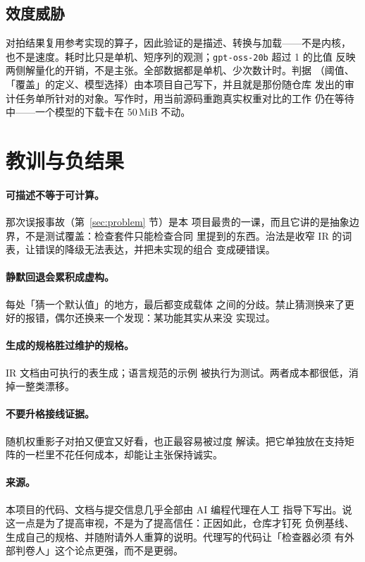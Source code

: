 \documentclass[11pt,a4paper]{ctexart}
\newcommand{\code}[1]{\texttt{#1}}
\newcommand{\q}[1]{「#1」}
\begin{document}
\subsection{效度威胁}

对拍结果复用参考实现的算子，因此验证的是描述、转换与加载——不是内核，
也不是速度。耗时比只是单机、短序列的观测；\code{gpt-oss-20b} 超过 1 的比值
反映两侧解量化的开销，不是主张。全部数据都是单机、少次数计时。判据
（阈值、\q{覆盖}的定义、模型选择）由本项目自己写下，并且就是那份随仓库
发出的审计任务单所针对的对象。写作时，用当前源码重跑真实权重对比的工作
仍在等待中——一个模型的下载卡在 50\,MiB 不动。

\section{教训与负结果}
\label{sec:lessons}

\paragraph{可描述不等于可计算。}那次误报事故（第~\ref{sec:problem} 节）是本
项目最贵的一课，而且它讲的是抽象边界，不是测试覆盖：检查套件只能检查合同
里提到的东西。治法是收窄 IR 的词表，让错误的降级无法表达，并把未实现的组合
变成硬错误。

\paragraph{静默回退会累积成虚构。}每处「猜一个默认值」的地方，最后都变成载体
之间的分歧。禁止猜测换来了更好的报错，偶尔还换来一个发现：某功能其实从来没
实现过。

\paragraph{生成的规格胜过维护的规格。}IR 文档由可执行的表生成；语言规范的示例
被执行为测试。两者成本都很低，消掉一整类漂移。

\paragraph{不要升格接线证据。}随机权重影子对拍又便宜又好看，也正最容易被过度
解读。把它单独放在支持矩阵的一栏里不花任何成本，却能让主张保持诚实。

\paragraph{来源。}本项目的代码、文档与提交信息几乎全部由 AI 编程代理在人工
指导下写出。说这一点是为了提高审视，不是为了提高信任：正因如此，仓库才钉死
负例基线、生成自己的规格、并随附请外人重算的说明。代理写的代码让「检查器必须
有外部判卷人」这个论点更强，而不是更弱。
\end{document}
